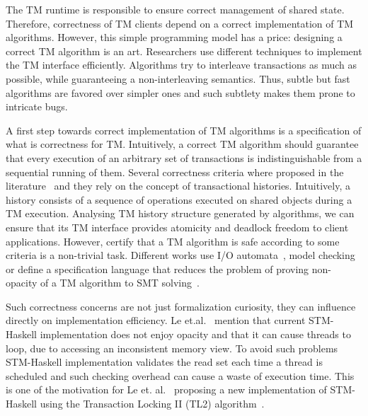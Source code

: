 \documentclass[3p,times,procedia]{elsarticle}
\theoremstyle{definition}
\begin{document}
The TM runtime is responsible to ensure correct management of shared state. Therefore,
correctness of TM clients depend on a correct implementation of TM algorithms. However,
this simple programming model has a price: designing a correct TM algorithm is an art.
Researchers use different techniques to implement the TM interface efficiently. Algorithms
try to interleave transactions as much as possible, while guaranteeing a non-interleaving
semantics. Thus, subtle but fast algorithms are favored over simpler ones and such subtlety
makes them prone to intricate bugs.


A first step towards correct implementation of TM algorithms is a specification of what
is correctness for TM. Intuitively, a correct TM algorithm should guarantee that every
execution of an arbitrary set of transactions is indistinguishable from a sequential
running of them. Several correctness criteria where proposed in the
literature~\cite{Guerraoui2008,Doherty2009,Imbs2009,LesaniP14} and
they rely on the concept of transactional histories. Intuitively,
a history consists of a sequence of operations executed on shared objects
during a TM execution. Analysing TM history structure generated by algorithms,
we can ensure that its TM interface provides atomicity and deadlock freedom to client
applications. However, certify that a TM algorithm is safe according to some criteria
is a non-trivial task. Different works use I/O automata~\cite{Lesani2012}, model
checking~\cite{CohenPZ08,cohen2007,Guerraoui2008a} or define a specification language that
reduces the problem of proving non-opacity of a TM algorithm to SMT solving~\cite{Lesani2013,DeMoura2008}.

Such correctness concerns are not just formalization curiosity, they can influence directly on implementation efficiency.
Le et.al.~\cite{Le2016} mention that current STM-Haskell implementation does not enjoy opacity and that it
can cause threads to loop, due to accessing an inconsistent memory view. To avoid such problems STM-Haskell
implementation validates the read set each time a thread is scheduled and such checking overhead can cause
a waste of execution time. This is one of the motivation for Le et. al.~\cite{Le2016} proposing a new
implementation of STM-Haskell using the Transaction Locking II (TL2) algorithm~\cite{Dice06}. 
\end{document}
